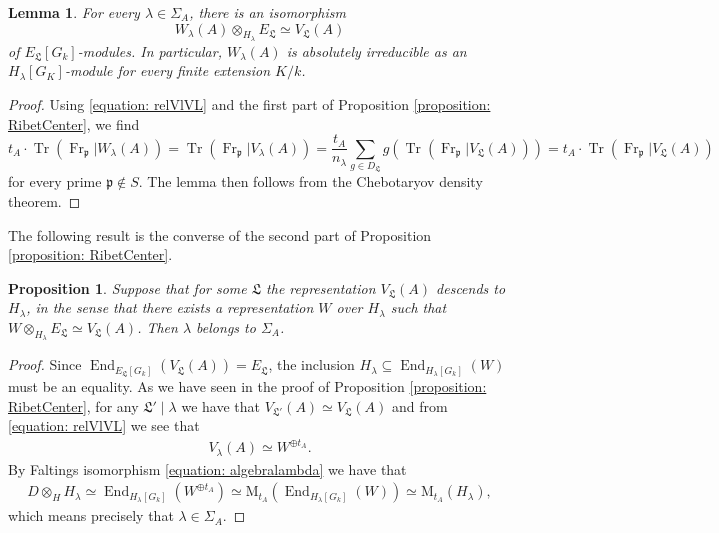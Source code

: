 \documentclass[oneside]{amsart}
\newtheorem{proposition}[theorem]{Proposition}
\newtheorem{lemma}[theorem]{Lemma}
\theoremstyle{remark}
\newcommand{\M}{\mathrm{M }}
\newcommand{\End}{\operatorname{End}}
\newcommand{\Frob}{\operatorname{Fr}}
\newcommand{\p}{\mathfrak{p}}
\newcommand{\Tr}{\operatorname{Tr}}
\newcommand{\Ll}{\mathfrak{L}}
\numberwithin{equation}{section}
\begin{document}
\begin{lemma}\label{lemma: realVL} For every $\lambda \in \Sigma_A$, there is an isomorphism
$$
W_\lambda(A) \otimes_{H_\lambda}E_{\Ll}\simeq V_{\Ll}(A)
$$
 of $E_{\Ll}[G_k]$-modules. In particular, $W_\lambda(A)$ is absolutely irreducible as an $H_\lambda[G_K]$-module for every finite extension $K/k$.
\end{lemma}

\begin{proof}
Using \eqref{equation: relVlVL} and the first part of Proposition \ref{proposition: RibetCenter}, we find 
$$
t_A\cdot \Tr(\Frob_\p | W_\lambda(A))=\Tr(\Frob_\p | V_\lambda(A))=\frac{t_A}{n_\lambda}\sum_{g\in D_\Ll}g(\Tr(\Frob_\p|V_{\Ll}(A)))=t_A\cdot \Tr(\Frob_\p|V_{\Ll}(A))
$$ 
for every prime $\p\not \in S$. The lemma then follows from the Chebotaryov density theorem.
\end{proof}


The following result is the converse of the second part of Proposition \ref{proposition: RibetCenter}.
\begin{proposition}  
  Suppose that for some $\Ll$ the representation $V_\Ll(A)$ descends to $H_\lambda$, in the sense that there exists a representation $W$ over $H_\lambda$ such that $W\otimes_{H_\lambda}E_\Ll\simeq V_\Ll(A)$. Then $\lambda$ belongs to $\Sigma_A$.
\end{proposition}
\begin{proof}
 Since $\End_{E_\Ll[G_k]}(V_\Ll(A))=E_\Ll$, the inclusion $H_\lambda \subseteq \End_{H_\lambda[G_k]}(W)$ must be an equality. As we have seen in the proof of Proposition \ref{proposition: RibetCenter}, for any $\Ll'\mid \lambda$ we have that $V_{\Ll'}(A)\simeq V_\Ll(A)$ and from \eqref{equation: relVlVL} we see that
  \begin{align*}
    V_\lambda(A) \simeq W^{\oplus  t_A}.
  \end{align*}
 By Faltings isomorphism \eqref{equation: algebralambda} we have that
  \begin{align*}
    D\otimes_H H_\lambda\simeq  \End_{H_\lambda[G_k]} (W^{\oplus t_A})\simeq \M_{t_A}(\End_{H_\lambda [G_k]}(W))\simeq \M_{t_A}(H_\lambda),
  \end{align*}
  which means precisely that $\lambda\in\Sigma_A$.
\end{proof}
\end{document}
